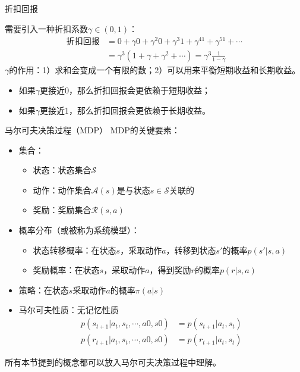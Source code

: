 \documentclass[aspectratio=169,xcolor=dvipsnames]{beamer}
\begin{document}
\begin{frame}{折扣回报}
\begin{center}
    \end{center}
    需要引入一种折扣系数$\gamma\in(0,1)$：
    \[
        \begin{aligned}
            \text{折扣回报}&=0+\gamma 0 +\gamma^2 0+\gamma^3 1 +\gamma^41+\gamma^51+\cdots\\
            &=\gamma^3(1+\gamma+\gamma^2+\cdots)=\gamma^3\frac{1}{1-\gamma}
        \end{aligned}
    \]
    $\gamma$的作用：1）求和会变成一个有限的数；2）可以用来平衡短期收益和长期收益。
    \begin{itemize}
        \item 如果$\gamma$更接近0，那么折扣回报会更依赖于短期收益；
        \item 如果$\gamma$更接近1，那么折扣回报会更依赖于长期收益。
    \end{itemize}
\end{frame}

\begin{frame}{马尔可夫决策过程（MDP）}
    MDP的关键要素：
    \begin{itemize}
        \item 集合：
        \begin{itemize}
            \item 状态：状态集合$\mathcal{S}$
            \item 动作：动作集合$\mathcal{A}(s)$是与状态$s\in \mathcal{S}$关联的
            \item 奖励：奖励集合$\mathcal{R}(s,a)$
        \end{itemize}
        \item 概率分布（或被称为系统模型）：
        \begin{itemize}
            \item 状态转移概率：在状态$s$，采取动作$a$，转移到状态$s'$的概率$p(s'|s,a)$
            \item 奖励概率：在状态$s$，采取动作$a$，得到奖励$r$的概率$p(r|s,a)$
        \end{itemize}
        \item 策略：在状态$s$采取动作$a$的概率$\pi(a|s)$
        \item 马尔可夫性质：无记忆性质
        \[
            \begin{aligned}
                p(s_{t+1}|a_t, s_t, \cdots, a0, s0)&=p(s_{t+1}|a_t,s_t) \\
                p(r_{t+1}|a_t, s_t, \cdots, a0, s0)&=p(r_{t+1}|a_t,s_t)
            \end{aligned}
        \]
    \end{itemize}
    所有本节提到的概念都可以放入马尔可夫决策过程中理解。 
\end{frame}
\end{document}
